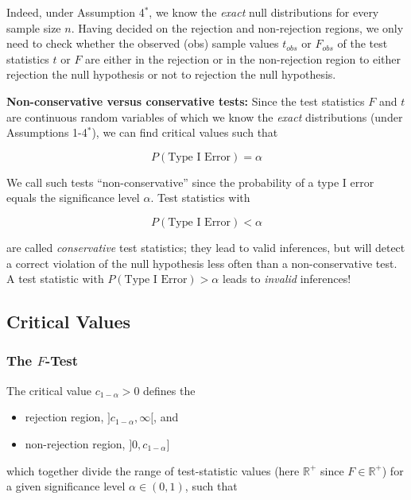 \documentclass[
  letterpaper,
  DIV=11,
  numbers=noendperiod]{scrreprt}
\providecommand{\tightlist}{%
  \setlength{\itemsep}{0pt}\setlength{\parskip}{0pt}}\usepackage{longtable,booktabs,array}
\theoremstyle{definition}
\theoremstyle{plain}
\theoremstyle{plain}
\theoremstyle{remark}
\begin{document}
Indeed, under Assumption 4\(^\ast\), we know the \emph{exact} null
distributions for every sample size \(n\). Having decided on the
rejection and non-rejection regions, we only need to check whether the
observed (obs) sample values \(t_{obs}\) or \(F_{obs}\) of the test
statistics \(t\) or \(F\) are either in the rejection or in the
non-rejection region to either rejection the null hypothesis or not to
rejection the null hypothesis.

\textbf{Non-conservative versus conservative tests:} Since the test
statistics \(F\) and \(t\) are continuous random variables of which we
know the \emph{exact} distributions (under Assumptions 1-4\(^\ast\)), we
can find critical values such that

\[
P(\text{Type I Error})=\alpha
\]

We call such tests ``non-conservative'' since the probability of a type
I error equals the significance level \(\alpha\). Test statistics with

\[
P(\text{Type I Error})<\alpha
\]

are called \emph{conservative} test statistics; they lead to valid
inferences, but will detect a correct violation of the null hypothesis
less often than a non-conservative test. A test statistic with
\(P(\text{Type I Error})>\alpha\) leads to \emph{invalid} inferences!

\hypertarget{critical-values}{%
\subsection{Critical Values}\label{critical-values}}

\hypertarget{the-f-test}{%
\subsubsection*{\texorpdfstring{The
\(F\)-Test}{The F-Test}}\label{the-f-test}}

The critical value \(c_{1-\alpha}>0\) defines the

\begin{itemize}
\tightlist
\item
  rejection region, \(]c_{1-\alpha},\infty[\), and
\item
  non-rejection region, \(]0,c_{1-\alpha}]\)
\end{itemize}

which together divide the range of test-statistic values (here
\(\mathbb{R}^+\) since \(F\in\mathbb{R}^+\)) for a given significance
level \(\alpha\in(0,1)\), such that
\end{document}
